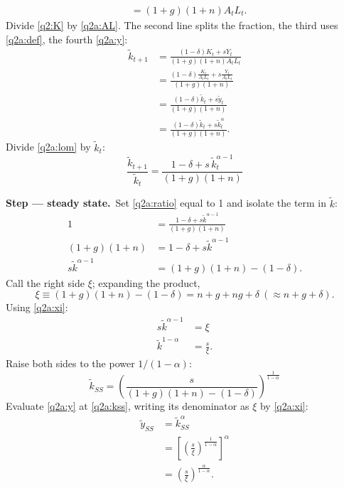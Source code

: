 \documentclass[11pt,a4paper]{article}
\newcommand{\passo}[2]{\par\smallskip\noindent\textbf{Step --- #1.}~#2}
\begin{document}
\begin{sol}
\begin{align}
&= (1+g)(1+n)A_tL_t. \label{q2a:AL}
\end{align}
Divide \eqref{q2:K} by \eqref{q2a:AL}. The second line splits the fraction, the third uses
\eqref{q2a:def}, the fourth \eqref{q2a:y}:
\begin{align}
\tilde k_{t+1} &= \frac{(1-\delta)K_t+sY_t}{(1+g)(1+n)A_tL_t}\nonumber\\
&= \frac{(1-\delta)\frac{K_t}{A_tL_t}+s\frac{Y_t}{A_tL_t}}{(1+g)(1+n)}\nonumber\\
&= \frac{(1-\delta)\tilde k_t+s\tilde y_t}{(1+g)(1+n)}\nonumber\\
&= \frac{(1-\delta)\tilde k_t+s\tilde k_t^{\alpha}}{(1+g)(1+n)}. \label{q2a:lom}
\end{align}
Divide \eqref{q2a:lom} by $\tilde k_t$:
\begin{equation}
\boxed{\frac{\tilde k_{t+1}}{\tilde k_t}=\frac{1-\delta+s\,\tilde k_t^{\alpha-1}}{(1+g)(1+n)}} \label{q2a:ratio}
\end{equation}
\passo{steady state}{Set \eqref{q2a:ratio} equal to 1 and isolate the term in $\tilde k$:}
\begin{align*}
1 &= \frac{1-\delta+s\tilde k^{\alpha-1}}{(1+g)(1+n)}\\
(1+g)(1+n) &= 1-\delta+s\tilde k^{\alpha-1}\\
s\tilde k^{\alpha-1} &= (1+g)(1+n)-(1-\delta).
\end{align*}
Call the right side $\xi$; expanding the product,
\begin{equation}
\xi\equiv(1+g)(1+n)-(1-\delta)=n+g+ng+\delta\ (\approx n+g+\delta). \label{q2a:xi}
\end{equation}
Using \eqref{q2a:xi}:
\begin{align*}
s\tilde k^{\alpha-1} &= \xi\\
\tilde k^{1-\alpha} &= \frac{s}{\xi}.
\end{align*}
Raise both sides to the power $1/(1-\alpha)$:
\begin{equation}
\boxed{\tilde k_{SS}=\left(\frac{s}{(1+g)(1+n)-(1-\delta)}\right)^{\frac{1}{1-\alpha}}} \label{q2a:kss}
\end{equation}
Evaluate \eqref{q2a:y} at \eqref{q2a:kss}, writing its denominator as $\xi$ by \eqref{q2a:xi}:
\begin{align}
\tilde y_{SS} &= \tilde k_{SS}^{\alpha}\nonumber\\
&= \left[\left(\frac{s}{\xi}\right)^{\frac{1}{1-\alpha}}\right]^{\alpha}\nonumber\\
&= \left(\frac{s}{\xi}\right)^{\frac{\alpha}{1-\alpha}}. \label{q2a:yss}

\end{align}
\end{sol}
\end{document}
